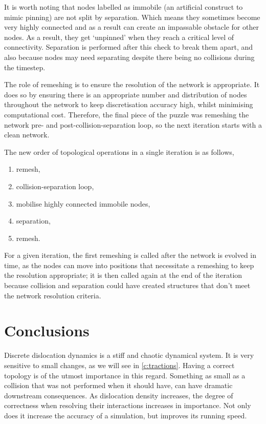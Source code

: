 It is worth noting that nodes labelled as immobile (an artificial construct to mimic pinning) are not split by separation. Which means they sometimes become very highly connected and as a result can create an impassable obstacle for other nodes. As a result, they get `unpinned' when they reach a critical level of connectivity. Separation is performed after this check to break them apart, and also because nodes may need separating despite there being no collisions during the timestep.

The role of remeshing is to ensure the resolution of the network is appropriate. It does so by ensuring there is an appropriate number and distribution of nodes throughout the network to keep discretisation accuracy high, whilst minimising computational cost. Therefore, the final piece of the puzzle was remeshing the network pre- and post-collision-separation loop, so the next iteration starts with a clean network.

The new order of topological operations in a single iteration is as follows,
\begin{enumerate}
    \item remesh,
    \item collision-separation loop,
    \item mobilise highly connected immobile nodes,
    \item separation,
    \item remesh.
\end{enumerate}
For a given iteration, the first remeshing is called after the network is evolved in time, as the nodes can move into positions that necessitate a remeshing to keep the resolution appropriate; it is then called again at the end of the iteration because collision and separation could have created structures that don't meet the network resolution criteria.

\section{Conclusions}

Discrete dislocation dynamics is a stiff and chaotic dynamical system. It is very sensitive to small changes, as we will see in \cref{c:tractions}. Having a correct topology is of the utmost importance in this regard. Something as small as a collision that was not performed when it should have, can have dramatic downstream consequences. As dislocation density increases, the degree of correctness when resolving their interactions increases in importance. Not only does it increase the accuracy of a simulation, but improves its running speed.

